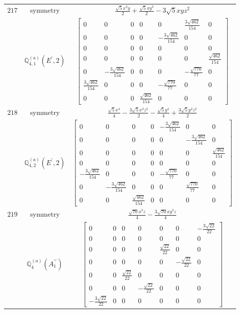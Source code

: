 \documentclass[fleqn,8pt,landscape]{jsarticle}
\begin{document}
\begin{longtable}{ccc}
$ 217 $ & $ \text{symmetry} $ & $ \frac{\sqrt{5} x^{3} y}{2} + \frac{\sqrt{5} x y^{3}}{2} - 3 \sqrt{5} x y z^{2} $ \\
$  $ & $ \mathbb{Q}_{4,1}^{(a)}(E^{\prime},2) $ & $ \begin{bmatrix} 0 & 0 & 0 & 0 & 0 & \frac{3 \sqrt{462}}{154} & 0 \\ 0 & 0 & 0 & 0 & - \frac{3 \sqrt{462}}{154} & 0 & 0 \\ 0 & 0 & 0 & 0 & 0 & 0 & 0 \\ 0 & 0 & 0 & 0 & 0 & 0 & \frac{\sqrt{462}}{154} \\ 0 & - \frac{3 \sqrt{462}}{154} & 0 & 0 & 0 & - \frac{\sqrt{770}}{77} & 0 \\ \frac{3 \sqrt{462}}{154} & 0 & 0 & 0 & - \frac{\sqrt{770}}{77} & 0 & 0 \\ 0 & 0 & 0 & \frac{\sqrt{462}}{154} & 0 & 0 & 0 \end{bmatrix} $ \\ \hline
$ 218 $ & $ \text{symmetry} $ & $ \frac{\sqrt{5} x^{4}}{4} - \frac{3 \sqrt{5} x^{2} z^{2}}{2} - \frac{\sqrt{5} y^{4}}{4} + \frac{3 \sqrt{5} y^{2} z^{2}}{2} $ \\
$  $ & $ \mathbb{Q}_{4,2}^{(a)}(E^{\prime},2) $ & $ \begin{bmatrix} 0 & 0 & 0 & 0 & - \frac{3 \sqrt{462}}{154} & 0 & 0 \\ 0 & 0 & 0 & 0 & 0 & - \frac{3 \sqrt{462}}{154} & 0 \\ 0 & 0 & 0 & 0 & 0 & 0 & \frac{\sqrt{462}}{154} \\ 0 & 0 & 0 & 0 & 0 & 0 & 0 \\ - \frac{3 \sqrt{462}}{154} & 0 & 0 & 0 & - \frac{\sqrt{770}}{77} & 0 & 0 \\ 0 & - \frac{3 \sqrt{462}}{154} & 0 & 0 & 0 & \frac{\sqrt{770}}{77} & 0 \\ 0 & 0 & \frac{\sqrt{462}}{154} & 0 & 0 & 0 & 0 \end{bmatrix} $ \\ \hline
$ 219 $ & $ \text{symmetry} $ & $ \frac{\sqrt{70} x^{3} z}{4} - \frac{3 \sqrt{70} x y^{2} z}{4} $ \\
$  $ & $ \mathbb{Q}_{4}^{(a)}(A_{1}^{\prime\prime}) $ & $ \begin{bmatrix} 0 & 0 & 0 & 0 & 0 & 0 & - \frac{3 \sqrt{22}}{22} \\ 0 & 0 & 0 & 0 & 0 & 0 & 0 \\ 0 & 0 & 0 & 0 & \frac{\sqrt{22}}{22} & 0 & 0 \\ 0 & 0 & 0 & 0 & 0 & - \frac{\sqrt{22}}{22} & 0 \\ 0 & 0 & \frac{\sqrt{22}}{22} & 0 & 0 & 0 & 0 \\ 0 & 0 & 0 & - \frac{\sqrt{22}}{22} & 0 & 0 & 0 \\ - \frac{3 \sqrt{22}}{22} & 0 & 0 & 0 & 0 & 0 & 0 \end{bmatrix} $ \\ \hline

\end{longtable}
\end{document}
